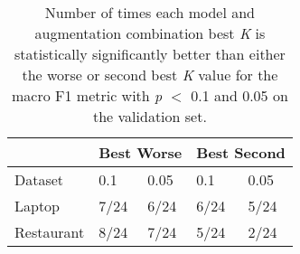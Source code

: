 \documentclass[11pt,a4paper]{article}
\begin{document}
\begin{table}[]
\begin{tabular}{|l|p{1cm}|p{1cm}|p{1cm}|p{1cm}|}
\hline
 &  \multicolumn{2}{l|}{Best Worse} & \multicolumn{2}{l|}{Best Second}  \\ 
\hline
Dataset &  0.1 & 0.05 & 0.1 & 0.05 \\ \hline
Laptop & 7/24 & 6/24 & 6/24 & 5/24 \\ \hline
Restaurant & 8/24 & 7/24 & 5/24 & 2/24 \\ \hline
\end{tabular}
\caption{Number of times each model and augmentation combination best \textit{K} is statistically significantly better than either the worse or second best \textit{K} value for the macro F1 metric with \textit{p} $<$ 0.1 and 0.05 on the validation set.}
\end{table}
\end{document}
